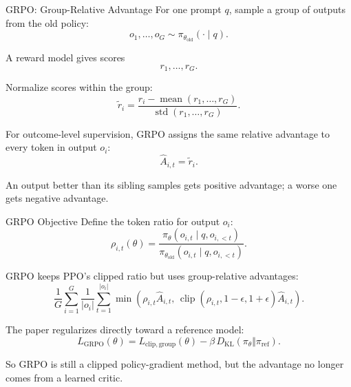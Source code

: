 \documentclass[aspectratio=169]{beamer}
\begin{document}
\begin{frame}{GRPO: Group-Relative Advantage}
\small
For one prompt $q$, sample a group of outputs from the old policy:
\[
o_1,\ldots,o_G \sim \pi_{\theta_{\mathrm{old}}}(\cdot\mid q).
\]

A reward model gives scores
\[
r_1,\ldots,r_G.
\]

\vspace{0.4em}
Normalize scores within the group:
\[
\widetilde r_i
=
\frac{r_i-\operatorname{mean}(r_1,\ldots,r_G)}
{\operatorname{std}(r_1,\ldots,r_G)}.
\]

\vspace{0.4em}
For outcome-level supervision, GRPO assigns the same relative advantage to every token in output $o_i$:
\[
\widehat A_{i,t}=\widetilde r_i.
\]

An output better than its sibling samples gets positive advantage; a worse one gets negative advantage.
\end{frame}

\begin{frame}{GRPO Objective}
\small
Define the token ratio for output $o_i$:
\[
\rho_{i,t}(\theta)
=
\frac{\pi_\theta(o_{i,t}\mid q,o_{i,<t})}
{\pi_{\theta_{\mathrm{old}}}(o_{i,t}\mid q,o_{i,<t})}.
\]

\vspace{0.3em}
GRPO keeps PPO's clipped ratio but uses group-relative advantages:
\[
\frac{1}{G}\sum_{i=1}^{G}\frac{1}{|o_i|}
\sum_{t=1}^{|o_i|}
\min\left(
\rho_{i,t}\widehat A_{i,t},\,
\operatorname{clip}(\rho_{i,t},1-\epsilon,1+\epsilon)\widehat A_{i,t}
\right).
\]

\vspace{0.3em}
The paper regularizes directly toward a reference model:
\[
L_{\mathrm{GRPO}}(\theta)
=
L_{\mathrm{clip,group}}(\theta)
-
\beta\,D_{\mathrm{KL}}(\pi_\theta\Vert \pi_{\mathrm{ref}}).
\]

\vspace{0.2em}
So GRPO is still a clipped policy-gradient method, but the advantage no longer comes from a learned critic.
\end{frame}
\end{document}
